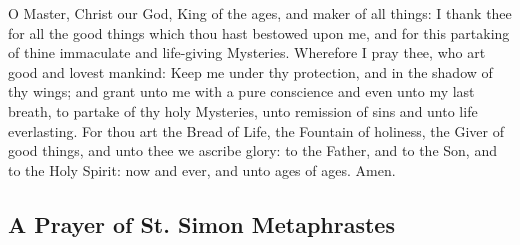     O Master, Christ our God, King of the ages, and maker of all things: I thank thee for all the good things which thou hast bestowed upon me, and for this partaking of thine immaculate and life-giving Mysteries. Wherefore I pray thee, who art good and lovest mankind: Keep me under thy protection, and in the shadow of thy wings; and grant unto me with a pure conscience and even unto my last breath, to partake of thy holy Mysteries, unto remission of sins and unto life everlasting. For thou art the Bread of Life, the Fountain of holiness, the Giver of good things, and unto thee we ascribe glory: to the Father, and to the Son, and to the Holy Spirit: now and ever, and unto ages of ages.  Amen.

\subsection{A Prayer of St. Simon Metaphrastes}

